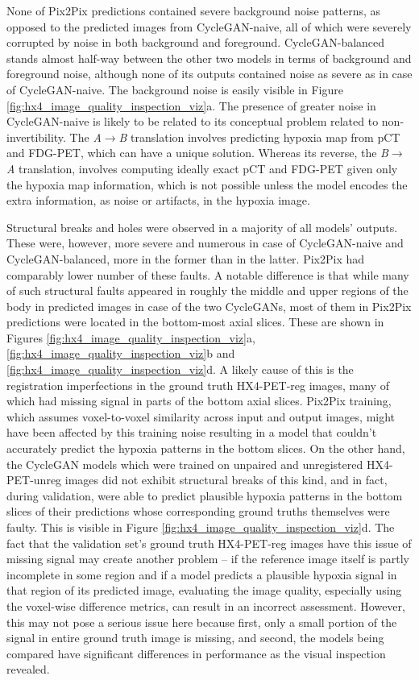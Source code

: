 None of Pix2Pix predictions contained severe background noise patterns, as opposed to the predicted images from CycleGAN-naive, all of which were severely corrupted by noise in both background and foreground. CycleGAN-balanced stands almost half-way between the other two models in terms of background and foreground noise, although none of its outputs contained noise as severe as in case of CycleGAN-naive. The background noise is easily visible in Figure \ref{fig:hx4_image_quality_inspection_viz}a. The presence of greater noise in CycleGAN-naive is likely to be related to its conceptual problem related to non-invertibility. The \textit{A}$\rightarrow$\textit{B} translation involves predicting hypoxia map from pCT and FDG-PET, which can have a unique solution. Whereas its reverse, the \textit{B}$\rightarrow$\textit{A} translation, involves computing ideally exact pCT and FDG-PET given only the hypoxia map information, which is not possible unless the model encodes the extra information, as noise or artifacts, in the hypoxia image.

Structural breaks and holes were observed in a majority of all models' outputs. These were, however, more severe and numerous in case of CycleGAN-naive and CycleGAN-balanced, more in the former than in the latter. Pix2Pix had comparably lower number of these faults. A notable difference is that while many of such structural faults appeared in roughly the middle and upper regions of the body in predicted images in case of the two CycleGANs, most of them in Pix2Pix predictions were located in the bottom-most axial slices. These are shown in Figures \ref{fig:hx4_image_quality_inspection_viz}a, \ref{fig:hx4_image_quality_inspection_viz}b and \ref{fig:hx4_image_quality_inspection_viz}d. A likely cause of this is the registration imperfections in the ground truth HX4-PET-reg images, many of which had missing signal in parts of the bottom axial slices. Pix2Pix training, which assumes voxel-to-voxel similarity across input and output images, might have been affected by this training noise resulting in a model that couldn't accurately predict the hypoxia patterns in the bottom slices. On the other hand, the CycleGAN models which were trained on unpaired and unregistered HX4-PET-unreg images did not exhibit structural breaks of this kind, and in fact, during validation, were able to predict plausible hypoxia patterns in the bottom slices of their predictions whose corresponding ground truths themselves were faulty. This is visible in Figure \ref{fig:hx4_image_quality_inspection_viz}d. The fact that the validation set's ground truth HX4-PET-reg images have this issue of missing signal may create another problem -- if the reference image itself is partly incomplete in some region and if a model predicts a plausible hypoxia signal in that region of its predicted image, evaluating the image quality, especially using the voxel-wise difference metrics, can result in an incorrect assessment. However, this may not pose a serious issue here because first, only a small portion of the signal in entire ground truth image is missing, and second, the models being compared have significant differences in performance as the visual inspection revealed.

